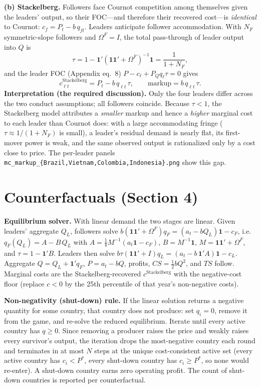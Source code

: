 \documentclass[11pt]{article}
\newcommand{\1}{\mathbf{1}}
\newcommand{\Om}{\Omega}
\newcommand{\OmF}{\Om^{F}}
\begin{document}
\textbf{(b) Stackelberg.} Followers face Cournot competition among themselves given
the leaders' output, so their FOC---and therefore their recovered cost---is
\emph{identical} to Cournot: $c_f=P_t-b\,q_{ft}$. Leaders anticipate follower
accommodation. With $N_{F}$ symmetric-slope followers and $\OmF=I$, the total
pass-through of leader output into $Q$ is
\[
\tau=1-\1'(\1\1'+\OmF)^{-1}\1=\frac{1}{1+N_{F}} ,
\]
and the leader FOC (Appendix eq.~8) $P-c_\ell+P_Q q_\ell\tau=0$ gives
\begin{equation}
c_{\ell t}^{\text{Stackelberg}}=P_t-b\,q_{\ell t}\,\tau,\qquad
\text{markup}=b\,q_{\ell t}\,\tau .
\end{equation}
\textbf{Interpretation (the required discussion).} Only the four leaders differ
across the two conduct assumptions; all followers coincide. Because $\tau<1$,
the Stackelberg model attributes a \emph{smaller} markup and hence a
\emph{higher} marginal cost to each leader than Cournot does: with a large
accommodating fringe ($\tau\approx1/(1+N_F)$ is small), a leader's residual demand
is nearly flat, its first-mover power is weak, and the same observed output is
rationalized only by a cost close to price. The per-leader panels
\texttt{mc\_markup\_\{Brazil,Vietnam,Colombia,Indonesia\}.png} show this gap.

\section{Counterfactuals (Section 4)}
\textbf{Equilibrium solver.} With linear demand the two stages are linear. Given
leaders' aggregate $Q_L$, followers solve
$b(\1\1'+\OmF)q_F=(a_t-bQ_L)\1-c_F$, i.e.\ $q_F(Q_L)=A-B\,Q_L$ with
$A=\tfrac1b M^{-1}(a_t\1-c_F)$, $B=M^{-1}\1$, $M=\1\1'+\OmF$, and
$\tau=1-\1'B$. Leaders then solve
$b\tau(\1\1'+I)q_L=(a_t-b\,\1'A)\1-c_L$. Aggregate $Q=Q_L+\1'q_F$,
$P=a_t-bQ$, profits, $CS=\tfrac12 bQ^2$, and $TS$ follow. Marginal costs are the
Stackelberg-recovered $c^{\text{Stackelberg}}$ with the negative-cost floor
(replace $c<0$ by the 25th percentile of that year's non-negative costs).

\medskip\noindent\textbf{Non-negativity (shut-down) rule.} If the linear solution
returns a negative quantity for some country, that country does not produce: set
$q_i=0$, remove it from the game, and re-solve the reduced equilibrium. Iterate
until every active country has $q\ge0$. Since removing a producer raises the price
and weakly raises every survivor's output, the iteration drops the most-negative
country each round and terminates in at most $N$ steps at the unique cost-consistent
active set (every active country has $c_i<P^\ast$, every shut-down country has
$c_i\ge P^\ast$, so none would re-enter). A shut-down country earns zero operating
profit. The count of shut-down countries is reported per counterfactual.
\end{document}
